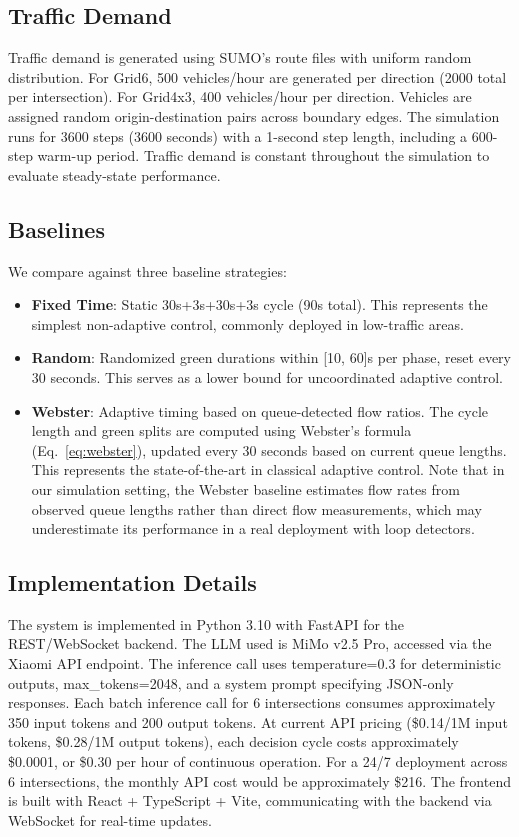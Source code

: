 \documentclass[conference]{IEEEtran}
\begin{document}
\subsection{Traffic Demand}
Traffic demand is generated using SUMO's route files with uniform random distribution. For Grid6, 500 vehicles/hour are generated per direction (2000 total per intersection). For Grid4x3, 400 vehicles/hour per direction. Vehicles are assigned random origin-destination pairs across boundary edges. The simulation runs for 3600 steps (3600 seconds) with a 1-second step length, including a 600-step warm-up period. Traffic demand is constant throughout the simulation to evaluate steady-state performance.

\subsection{Baselines}
We compare against three baseline strategies:
\begin{itemize}[nosep]
    \item \textbf{Fixed Time}: Static 30s+3s+30s+3s cycle (90s total). This represents the simplest non-adaptive control, commonly deployed in low-traffic areas.
    \item \textbf{Random}: Randomized green durations within [10, 60]s per phase, reset every 30 seconds. This serves as a lower bound for uncoordinated adaptive control.
    \item \textbf{Webster}: Adaptive timing based on queue-detected flow ratios. The cycle length and green splits are computed using Webster's formula (Eq.~\ref{eq:webster}), updated every 30 seconds based on current queue lengths. This represents the state-of-the-art in classical adaptive control. Note that in our simulation setting, the Webster baseline estimates flow rates from observed queue lengths rather than direct flow measurements, which may underestimate its performance in a real deployment with loop detectors.
\end{itemize}

\subsection{Implementation Details}
The system is implemented in Python 3.10 with FastAPI for the REST/WebSocket backend. The LLM used is MiMo v2.5 Pro, accessed via the Xiaomi API endpoint. The inference call uses temperature=0.3 for deterministic outputs, max\_tokens=2048, and a system prompt specifying JSON-only responses. Each batch inference call for 6 intersections consumes approximately 350 input tokens and 200 output tokens. At current API pricing (\$0.14/1M input tokens, \$0.28/1M output tokens), each decision cycle costs approximately \$0.0001, or \$0.30 per hour of continuous operation. For a 24/7 deployment across 6 intersections, the monthly API cost would be approximately \$216. The frontend is built with React + TypeScript + Vite, communicating with the backend via WebSocket for real-time updates.
\end{document}
